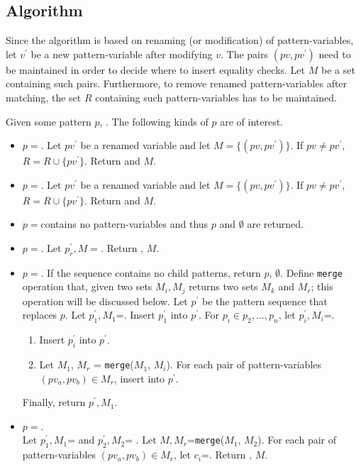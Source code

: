 \subsection{Algorithm}
Since the algorithm is based on renaming (or modification) of pattern-variables, let $v^{\prime}$ be a new pattern-variable after modifying $v$. The pairs $(pv, pv^{\prime})$ need to be maintained in order to decide where to insert equality checks. Let $M$ be a set containing such pairs. Furthermore, to remove renamed pattern-variables after matching, the set $R$ containing such pattern-variables has to be maintained.

Given some pattern $p$, . The following kinds of $p$ are of interest.
\begin{itemize}
\item $p=$\space \BuiltInPattern. Let $pv^{\prime}$ be a renamed variable and let $M=\{(pv, pv^{\prime})\}$. If $pv \neq pv^{\prime}$, $R=R \cup \{pv^{\prime}\}$. Return \BuiltInPattern[$tag$][$pv^{\prime}$][false] and $M$.
\item $p=$\space \NonTerminal. Let $pv^{\prime}$ be a renamed variable and let $M=\{(pv, pv^{\prime})\}$. If $pv \neq pv^{\prime}$, $R=R \cup \{pv^{\prime}\}$. Return \NonTerminal[$nt$][$pv^{\prime}$][false] and $M$.
\item $p=$\space \LiteralPattern \space contains no pattern-variables and thus $p$ and $\emptyset$ are returned.
\item $p=$\space \PatternRepeat. Let $p_r^{\prime}, M=$\space{}. Return \PatternRepeat[$p_r^{\prime}$], $M$.
\item
$p=$\space \PatternSequence. If the sequence contains no child patterns, return $p$, $\emptyset$. Define \texttt{merge} operation that, given two sets $M_i, M_j$ returns two sets $M_k$ and $M_r$; this operation will be discussed below.
Let $p^{\prime}$ be the pattern sequence that replaces $p$.
Let $p_1^{\prime}, M_1$=. Insert $p_1^{\prime}$ into $p^{\prime}$. For $p_i \in p_2, ..., p_n$, let $p_i^{\prime}, M_i$=.
	\begin{enumerate}
	\item
	Insert $p_i^{\prime}$ into $p^{\prime}$.
	\item
	Let $M_1$, $M_r$ = \texttt{merge}($M_1$, $M_i$). For each pair of pattern-variables $(pv_a, pv_b) \in M_r$, insert \PatternCheckConstraint[$pv_a$][$pv_b$][false] into $p^{\prime}$.
	\end{enumerate}
Finally, return $p^{\prime}, M_1$.

\item
$p=$\space \PatternInHole.\\ Let $p_1^{\prime}, M_1$=  and $p_2^{\prime}, M_2$= . Let $M, M_r$=\texttt{merge}($M_1$, $M_2$). For each pair of pattern-variables $(pv_a, pv_b) \in M_r$, let $c_i$=\PatternCheckConstraint[$pv_a$][$pv_b$][false]. Return \PatternInHole[$p_1^{\prime}$][$p_2^{\prime}$][$c_1$][$c_n$][false], $M$.
\end{itemize}

